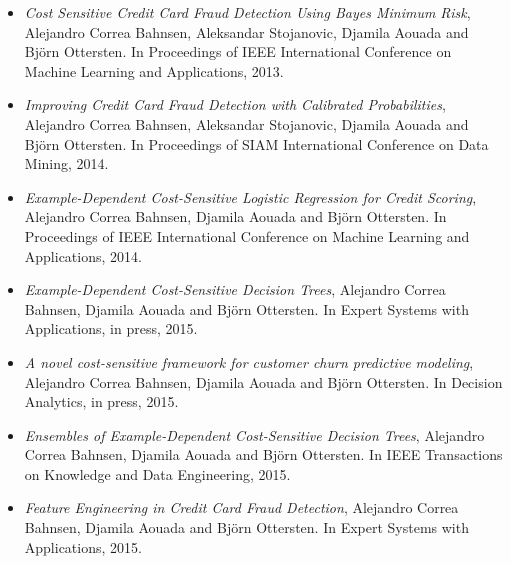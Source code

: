 \begin{itemize}
\item \citep{CorreaBahnsen2013} \textit{Cost Sensitive Credit Card Fraud Detection Using Bayes 
Minimum Risk}, Alejandro Correa Bahnsen,  Aleksandar Stojanovic, Djamila Aouada and Bj\"orn 
Ottersten. In Proceedings of IEEE International Conference on Machine Learning and Applications, 
2013.

\item \citep{CorreaBahnsen2014} \textit{Improving Credit Card Fraud Detection with Calibrated 
Probabilities}, Alejandro Correa Bahnsen, Aleksandar Stojanovic, Djamila Aouada and Bj\"orn 
Ottersten. In Proceedings of SIAM International Conference on Data Mining, 2014.

\item \citep{CorreaBahnsen2014b} \textit{Example-Dependent Cost-Sensitive Logistic Regression for 
Credit Scoring}, Alejandro Correa Bahnsen, Djamila Aouada and Bj\"orn Ottersten.
In Proceedings of IEEE International Conference on Machine Learning and Applications, 2014.

\item \citep{CorreaBahnsen2015} \textit{Example-Dependent Cost-Sensitive Decision Trees},
Alejandro Correa Bahnsen, Djamila Aouada and Bj\"orn Ottersten.
In Expert Systems with Applications, in press, 2015.

\item \citep{CorreaBahnsen2015a} \textit{A novel cost-sensitive framework for customer churn 
predictive modeling}, Alejandro Correa Bahnsen, Djamila Aouada and Bj\"orn Ottersten.
In Decision Analytics, in press, 2015.

\item \citep{CorreaBahnsen2015b} \textit{Ensembles of Example-Dependent Cost-Sensitive Decision 
Trees}, Alejandro Correa Bahnsen, Djamila Aouada and Bj\"orn Ottersten.
In IEEE Transactions on Knowledge and Data Engineering, 2015.

\item \citep{CorreaBahnsen2015c} \textit{Feature Engineering in Credit Card Fraud Detection},
Alejandro Correa Bahnsen, Djamila Aouada and Bj\"orn Ottersten. In Expert Systems with 
Applications, 2015.

\end{itemize}
